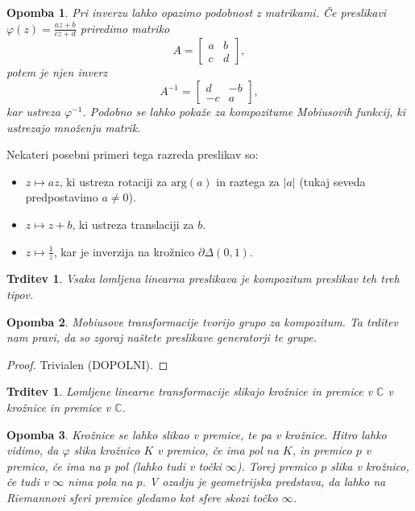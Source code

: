 \documentclass[10pt, a4paper]{article}
\newtheorem{trditev}[izr]{Trditev}
\newtheorem*{opomba}{Opomba}
\newenvironment{noticeC}{%
  \tcolorbox[%
  notitle,
  empty,
  enhanced,  %
  breakable,
  coltext=black, 
  fontupper=\rmfamily,
  parbox=false,
  noparskip,
  sharp corners,
  boxrule=-1pt,  %
  frame hidden,
  left=7pt,  %
  right=7pt,
  top=5pt,
  bottom=5pt,
  before skip=2.5ex plus 2pt,
  after skip=2.5ex plus 2pt,
  overlay unbroken and last={%
  },
  ]}
{\endtcolorbox}
\newenvironment{dokaz}%
  {\begin{noticeC}\begin{proof}}%
  {\end{proof}\end{noticeC}}
\newcommand{\C}{\mathbb {C}}
\begin{document}
\begin{opomba}
  Pri inverzu lahko opazimo podobnost z matrikami. Če preslikavi 
  $\varphi(z) = \frac{az + b}{cz + d}$ priredimo matriko 
  $$A = \begin{bmatrix}
    a & b\\
    c & d
  \end{bmatrix},$$
  potem je njen inverz 
  $$A^{-1} = \begin{bmatrix}
    d & - b\\
    -c & a
  \end{bmatrix},$$
  kar ustreza $\varphi^{-1}$.
  Podobno se lahko pokaže za kompozitume Mobiusovih funkcij, ki ustrezajo množenju matrik.
\end{opomba}

Nekateri posebni primeri tega razreda preslikav so:
\begin{itemize}
  \item $z \mapsto az$, ki ustreza rotaciji za $\mathrm{arg}(a)$ in raztega za $|a|$ 
(tukaj seveda predpostavimo $a \neq 0$).
  \item $z \mapsto z + b$, ki ustreza translaciji za $b$.
  \item $z \mapsto\frac{1}{z}$, kar je inverzija na krožnico $\partial \Delta (0, 1)$.
\end{itemize}

\begin{trditev}
  Vsaka lomljena linearna preslikava je kompozitum preslikav teh treh tipov.
\end{trditev}

\begin{opomba}
  Mobiusove transformacije tvorijo grupo za kompozitum. Ta trditev nam pravi, 
  da so zgoraj naštete preslikave generatorji te grupe.
\end{opomba}

\begin{dokaz}
  Trivialen (DOPOLNI).
\end{dokaz} 

\begin{trditev}
  Lomljene linearne transformacije slikajo krožnice in premice v $\C$ v krožnice in premice v $\C$.
\end{trditev}

\begin{opomba}
  Krožnice se lahko slikao v premice, te pa v krožnice. Hitro lahko vidimo,
  da $\varphi$ slika krožnico $K$ v premico, če ima pol na $K$, in premico $p$ v premico, če 
  ima na $p$ pol (lahko tudi v točki $\infty$). Torej premico $p$ slika v krožnico,
  če tudi v $\infty$ nima pola na $p$. V ozadju je geometrijska predstava, da lahko 
  na Riemannovi sferi premice gledamo kot sfere skozi točko $\infty$.
\end{opomba}
\end{document}
